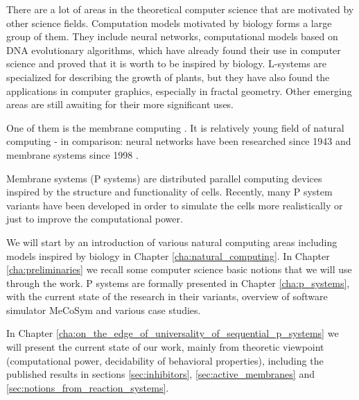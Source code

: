 
There are a lot of areas in the theoretical computer science that are motivated by other science fields. Computation models motivated by biology forms a large group of them. They include neural networks, computational models based on DNA evolutionary algorithms, which have already found their use in computer science and proved that it is worth to be inspired by biology. L-systems are specialized for describing the growth of plants, but they have also found the applications in computer graphics, especially in fractal geometry. Other emerging areas are still awaiting for their more significant uses.

One of them is the membrane computing \cite{Paun10OxfordHandbookMembraneComputing}. It is relatively young field of natural computing - in comparison: neural networks have been researched since 1943 and membrane systems since 1998 \cite{Paun98}.

Membrane systems (P systems) are distributed parallel computing devices inspired by the structure and functionality of cells. Recently, many P system variants have been developed in order to simulate the cells more realistically or just to improve the computational power.

We will start by an introduction of various natural computing areas including models inspired by biology in Chapter \ref{cha:natural_computing}. In Chapter \ref{cha:preliminaries} we recall some computer science basic notions that we will use through the work. P systems are formally presented in Chapter \ref{cha:p_systems}, with the current state of the research in their variants, overview of software simulator MeCoSym and various case studies.

In Chapter \ref{cha:on_the_edge_of_universality_of_sequential_p_systems} we will present the current state of our work, mainly from theoretic viewpoint (computational power, decidability of behavioral properties), including the published results in sections \ref{sec:inhibitors}, \ref{sec:active_membranes} and \ref{sec:notions_from_reaction_systems}.
